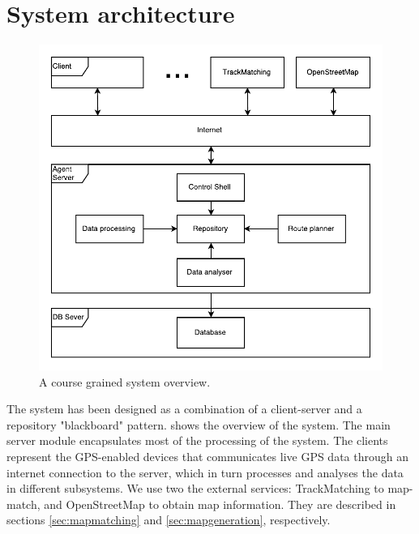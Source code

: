 \section{System architecture}\label{sec:systemarchitecture}
\begin{figure}[h!]
  \centering
    \includegraphics[width=1\textwidth]{figures/architecture.pdf}
    \caption{A course grained system overview.}
    \label{fig:systemoverview}
\end{figure}

The system has been designed as a combination of a client-server and a repository "blackboard" pattern.  shows the overview of the system. The main server module encapsulates most of the processing of the system. The clients represent the GPS-enabled devices that communicates live GPS data through an internet connection to the server, which in turn processes and analyses the data in different subsystems. We use two the external services: TrackMatching to map-match, and OpenStreetMap to obtain map information. They are described in sections \ref{sec:mapmatching} and \ref{sec:mapgeneration}, respectively.

